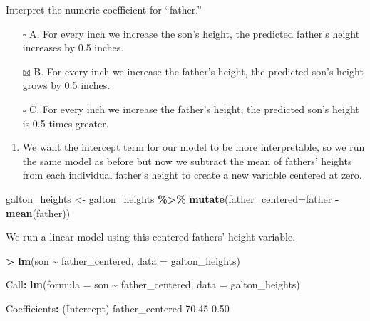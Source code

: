 \documentclass[
]{article}
\newenvironment{Shaded}{\begin{snugshade}}{\end{snugshade}}
\newcommand{\DataTypeTok}[1]{\textcolor[rgb]{0.13,0.29,0.53}{#1}}
\newcommand{\FloatTok}[1]{\textcolor[rgb]{0.00,0.00,0.81}{#1}}
\newcommand{\KeywordTok}[1]{\textcolor[rgb]{0.13,0.29,0.53}{\textbf{#1}}}
\newcommand{\NormalTok}[1]{#1}
\newcommand{\OperatorTok}[1]{\textcolor[rgb]{0.81,0.36,0.00}{\textbf{#1}}}
\newcommand{\StringTok}[1]{\textcolor[rgb]{0.31,0.60,0.02}{#1}}
\providecommand{\tightlist}{%
  \setlength{\itemsep}{0pt}\setlength{\parskip}{0pt}}
\begin{document}
Interpret the numeric coefficient for ``father.''

\begin{itemize}
\tightlist
\item[$\square$]
  A. For every inch we increase the son's height, the predicted father's
  height increases by 0.5 inches.
\item[$\boxtimes$]
  B. For every inch we increase the father's height, the predicted son's
  height grows by 0.5 inches.
\item[$\square$]
  C. For every inch we increase the father's height, the predicted son's
  height is 0.5 times greater.
\end{itemize}

\begin{enumerate}
\def\labelenumi{\arabic{enumi}.}
\setcounter{enumi}{1}
\tightlist
\item
  We want the intercept term for our model to be more interpretable, so
  we run the same model as before but now we subtract the mean of
  fathers' heights from each individual father's height to create a new
  variable centered at zero.
\end{enumerate}

\begin{Shaded}
\begin{Highlighting}[]
\NormalTok{galton\_heights \textless{}{-}}\StringTok{ }\NormalTok{galton\_heights }\OperatorTok{\%\textgreater{}\%}
\StringTok{    }\KeywordTok{mutate}\NormalTok{(}\DataTypeTok{father\_centered=}\NormalTok{father }\OperatorTok{{-}}\StringTok{ }\KeywordTok{mean}\NormalTok{(father))}
\end{Highlighting}
\end{Shaded}

We run a linear model using this centered fathers' height variable.

\begin{Shaded}
\begin{Highlighting}[]
\OperatorTok{\textgreater{}}\StringTok{ }\KeywordTok{lm}\NormalTok{(son }\OperatorTok{\textasciitilde{}}\StringTok{ }\NormalTok{father\_centered, }\DataTypeTok{data =}\NormalTok{ galton\_heights)}

\NormalTok{Call}\OperatorTok{:}
\KeywordTok{lm}\NormalTok{(}\DataTypeTok{formula =}\NormalTok{ son }\OperatorTok{\textasciitilde{}}\StringTok{ }\NormalTok{father\_centered, }\DataTypeTok{data =}\NormalTok{ galton\_heights)}

\NormalTok{Coefficients}\OperatorTok{:}
\NormalTok{(Intercept)    father\_centered  }
    \FloatTok{70.45}          \FloatTok{0.50}  
\end{Highlighting}
\end{Shaded}
\end{document}
